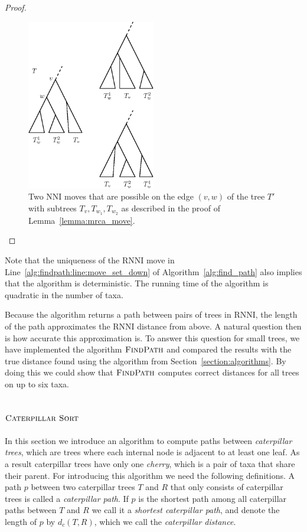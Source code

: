 \documentclass{amsart}
\newcommand{\nni}{\mathrm{NNI}}
\newcommand{\rnni}{\mathrm{RNNI}}
\newcommand{\csort}{\textsc{Caterpillar Sort}}
\newcommand{\findpath}{\textsc{FindPath}}
\begin{document}
\begin{proof}
\begin{figure}[H]
\centering
\includegraphics[width=0.5\textwidth]{mrca_move}
\vspace{12pt}
\caption{Two $\nni$ moves that are possible on the edge $(v,w)$ of the tree $T'$ with subtrees $T_v, T_{w_1}, T_{w_2}$ as described in the proof of Lemma~\ref{lemma:mrca_move}.}
\label{fig:mrca_move}
\end{figure}
\end{proof}

Note that the uniqueness of the $\rnni$ move in Line~\ref{alg:findpath:line:move_set_down} of Algorithm~\ref{alg:find_path} also implies that the algorithm is deterministic.
The running time of the algorithm is quadratic in the number of taxa.

Because the algorithm returns a path between pairs of trees in $\rnni$, the length of the path approximates the $\rnni$ distance from above.
A natural question then is how accurate this approximation is.
To answer this question for small trees, we have implemented the algorithm $\findpath$
\autocite{}
and compared the results with the true distance found using the algorithm from Section~\ref{section:algorithms}.
By doing this we could show that $\findpath$ computes correct distances for all trees on up to six taxa.

\subsection{$\csort$}
\label{section:alg_csort}

In this section we introduce an algorithm to compute paths between \emph{caterpillar trees}, which are trees where each internal node is adjacent to at least one leaf.
As a result caterpillar trees have only one \emph{cherry}, which is a pair of taxa that share their parent.
For introducing this algorithm we need the following definitions.
A path $p$ between two caterpillar trees $T$ and $R$ that only consists of caterpillar trees is called a \emph{caterpillar path}.
If $p$ is the shortest path among all caterpillar paths between $T$ and $R$ we call it a \emph{shortest caterpillar path}, and denote the length of $p$ by $d_c(T,R)$, which we call the \emph{caterpillar distance}.
\end{document}

